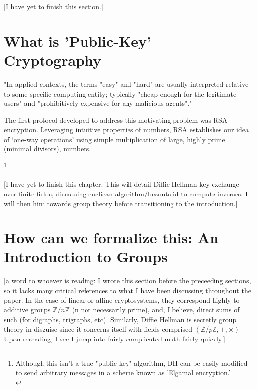 \documentclass[11pt, a4paper]{report}
\newcommand{\integers}{\mathbb{Z}}
\begin{document}
[I have yet to finish this section.]

\section{What is 'Public-Key' Cryptography}
"In applied contexts, the terms "easy" and "hard" are usually interpreted relative to some specific computing entity; typically "cheap enough for the legitimate users" and "prohibitively expensive for any malicious agents"."

The first protocol developed to address this motivating problem was RSA encryption. Leveraging intuitive properties of numbers, RSA establishes our idea of ‘one-way operations’ using simple multiplication of large, highly prime (minimal divisors), numbers. 

\footnote[0]{Although this isn't a true "public-key" algorithm, DH can be easily modified to send arbitrary messages in a scheme known as 'Elgamal encryption.'\\\autocite{elgamal}}

[I have yet to finish this chapter. This will detail Diffie-Hellman key exchange over finite fields, discussing eucliean algorithm/bezouts id to compute inverses. I will then hint towards group theory before transitioning to the introduction.]

\section{How can we formalize this: An Introduction to Groups}
[a word to whoever is reading: I wrote this section before the preceeding sections, so it lacks many critical references to what I have been discussing throughout the paper. In the case of linear or affine cryptosystems, they correspond highly to additive groups $\integers / n \integers$ (n not necessarily prime), and, I believe, direct sums of such (for digraphs, trigraphs, etc). Similarly, Diffie Hellman is secretly group theory in disguise since it concerns itself with fields comprised $(\integers / p \integers, +, \times)$ Upon rereading, I see I jump into fairly complicated math fairly quickly.]
\end{document}
